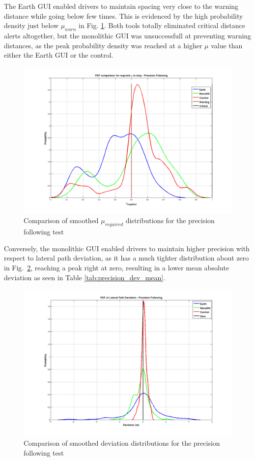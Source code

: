 The Earth GUI enabled drivers to maintain spacing very close to the warning distance while going below few times. This is evidenced by the high probability density just below $\mu_{warn}$ in Fig. \ref{fig:precision_mu_dist}. Both tools totally eliminated critical distance alerts altogether, but the monolithic GUI was unsuccessfull at preventing warning distances, as the peak probability density was reached at a higher $\mu$ value than either the Earth GUI or the control.
\begin{figure}[ht] \centering %
    \includegraphics[width=6in]{./figs/precision_following_mu_distribution.png}
    \caption{Comparison of smoothed $\mu_{required}$ distributions for the precision following test} \label{fig:precision_mu_dist}
\end{figure}
Conversely, the monolithic GUI enabled drivers to maintain higher precision with respect to lateral path deviation, as it has a much tighter distribution about zero in Fig.~\ref{fig:precision_dev_dist}, reaching a peak right at zero, resulting in a lower mean absolute deviation as seen in Table \ref{tab:precision_dev_mean}.
\begin{figure}[ht] \centering %
    \includegraphics[width=6in]{./figs/precision_following_dev_pdf.png}
    \caption{Comparison of smoothed deviation distributions for the precision following test} \label{fig:precision_dev_dist}
\end{figure}



